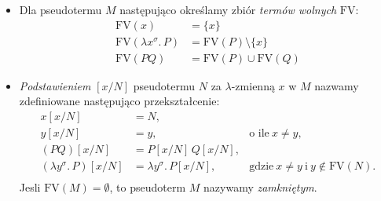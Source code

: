 \begin{definicja}
\begin{itemize}
  \item Dla pseudotermu \(M\) następująco określamy zbiór \emph{termów wolnych} \(\mathrm{FV}\):
    \begin{align*}
      \mathrm{FV}(x) &= \{x\}\\
      \mathrm{FV}(\lambda x^\sigma .\, P)  &= \mathrm{FV}(P)\setminus\{x\}\\
      \mathrm{FV}(P Q) &= \mathrm{FV}(P)\cup\mathrm{FV}(Q)
    \end{align*}

  \item \emph{Podstawieniem} \([x/N]\) pseudotermu \(N\) za \(\lambda\)-zmienną \(x\) w \(M\) nazwamy zdefiniowane następująco przekształcenie:
  \begin{align*}
    x[x/N] &= N,\\
    y[x/N] &= y,\ &\text{o ile}\ x\neq y,\\
    (PQ)[x/N] &= P[x/N]\,Q[x/N],\\
    (\lambda y^\sigma.\, P)[x/N] &= \lambda y^\sigma .\,P[x/N],\ &\text{gdzie}\ x\neq y\ \text{i}\ y\not\in \mathrm{FV}(N).\\
  \end{align*}
    Jesli \(\mathrm{FV}(M)=\emptyset\), to pseudoterm \(M\) nazywamy \emph{zamkniętym}. 
    \begin{fakt}$ $\\

\end{fakt}
\end{itemize}
\end{definicja}
